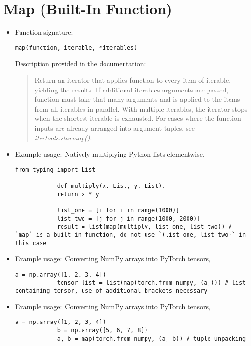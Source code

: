 \documentclass[12pt, a4paper]{scrbook}
\numberwithin{equation}{section}
\theoremstyle{definition}
\theoremstyle{definition}
\begin{document}
	\section{Map (Built-In Function)}
	
	\begin{itemize}
		\item Function signature:
		
		\begin{lstlisting}[style=mystylepython, label=alg:map__func_signa, xleftmargin=\parindent]
			map(function, iterable, *iterables)
		\end{lstlisting}
		
		Description provided in the \href{https://docs.python.org/3/library/functions.html#map}{documentation}:
		
		\begin{quote}
			Return an iterator that applies function to every item of iterable, yielding the results. If additional iterables arguments are passed, function must take that many arguments and is applied to the items from all iterables in parallel. With multiple iterables, the iterator stops when the shortest iterable is exhausted. For cases where the function inputs are already arranged into argument tuples, see \textit{itertools.starmap()}.
		\end{quote}		
		
		\item Example usage:~Natively multiplying Python lists elementwise,
		
		\begin{lstlisting}[style=mystylepython, label=alg:map__python_lists_elementwise, xleftmargin=\parindent]
			from typing import List
			
			def multiply(x: List, y: List):
			return x * y
			
			list_one = [i for i in range(1000)]
			list_two = [j for j in range(1000, 2000)]
			result = list(map(multiply, list_one, list_two)) # `map` is a built-in function, do not use `(list_one, list_two)` in this case
		\end{lstlisting}
		
		\item Example usage:~Converting NumPy arrays into PyTorch tensors,
		
		\begin{lstlisting}[style=mystylepython, label=alg:map__numpy_torch_conv, xleftmargin=\parindent]
			a = np.array([1, 2, 3, 4])
			tensor_list = list(map(torch.from_numpy, (a,))) # list containing tensor, use of additional brackets necessary
		\end{lstlisting}
		
		\item Example usage:~Converting NumPy arrays into PyTorch tensors,
		
		\begin{lstlisting}[style=mystylepython, label=alg:map__numpy_torch_tuple_unpacking, xleftmargin=\parindent]
			a = np.array([1, 2, 3, 4]) 
			b = np.array([5, 6, 7, 8]) 
			a, b = map(torch.from_numpy, (a, b)) # tuple unpacking
		\end{lstlisting}
		
	\end{itemize}
	
\end{document}
